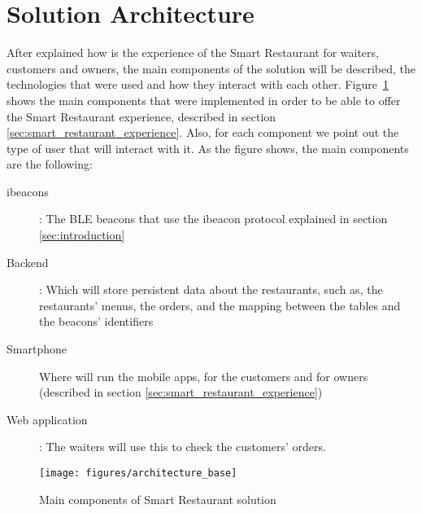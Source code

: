 
\section{Solution Architecture}
\label{sec:solution_architecture}
After explained how is the experience of the Smart Restaurant for waiters,
customers and owners, the main components of the solution will be described,
the technologies that were used and how they interact with each other.
Figure~\ref{fig:architecture_base} shows the main components that were
implemented in order to be able to offer the Smart Restaurant experience,
described in section \ref{sec:smart_restaurant_experience}.
Also, for each component we point out the type of user that will interact
with it.
As the figure shows, the main components are the following:
\begin{description}
  \item[ibeacons]: The BLE beacons that use the ibeacon protocol explained
  in section \ref{sec:introduction}
  \item[Backend]: Which will store persistent data about the restaurants,
  such as, the restaurants' menus, the orders, and the mapping between
  the tables and the beacons' identifiers
  \item[Smartphone] Where will run the mobile apps, for the customers
  and for owners (described in section \ref{sec:smart_restaurant_experience})
  \item[Web application]: The waiters will use this to check the
  customers' orders.
\end{description}

\begin{figure}[!ht]
  \centering
    \texttt{[image: figures/architecture\_base]}
    \caption{Main components of Smart Restaurant solution}
    \label{fig:architecture_base}
\end{figure}

